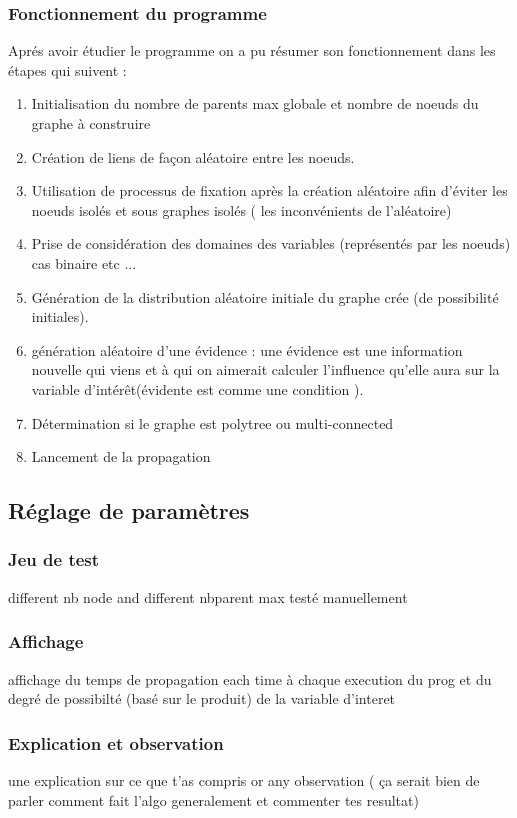 \documentclass[12pt,a4paper,oneside]{book}
\begin{document}
	 \subsubsection{Fonctionnement du programme}
	 Aprés avoir étudier le programme on a pu résumer son fonctionnement dans les étapes qui suivent :
	 \begin{enumerate}
	 	\item Initialisation du nombre de parents max globale et nombre de noeuds du graphe à construire
	 	\item Création de liens de façon aléatoire entre les noeuds.
	 	\item Utilisation de processus de fixation après la création aléatoire afin d'éviter les noeuds isolés et sous graphes isolés ( les inconvénients de l'aléatoire)
	 	\item Prise de considération des domaines des variables (représentés par les noeuds)
	 	cas binaire etc ...
	 	\item Génération de la distribution aléatoire initiale du graphe crée (de possibilité initiales).
	 	\item génération aléatoire d'une évidence  : une évidence est une information nouvelle qui viens et à qui on aimerait calculer l'influence qu'elle aura sur la variable d'intérêt(évidente est comme une condition ).
	 	\item Détermination si le graphe est polytree ou multi-connected
	 	\item Lancement de la propagation 
	 	
	 \end{enumerate}
	 
	\subsection{Réglage de paramètres}
	\subsubsection{Jeu de test}
	different nb node and  different nbparent max testé manuellement
	\subsubsection{Affichage}
	affichage du temps de propagation each time à chaque execution du prog et du degré de possibilté (basé sur le produit) de la variable d'interet 
	\subsubsection{Explication et observation}
	une explication  sur ce que t'as compris or any observation ( ça serait bien de parler comment fait l'algo generalement et commenter tes resultat)
	
\end{document}
